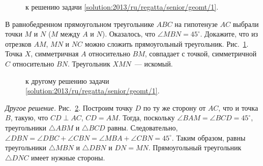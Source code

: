 \ifsolution
\begin{figure}\centering
    \caption{к решению задачи \ref{solution:2013/ru/regatta/senior/geomt/1}.}
    \label{fig:solution:2013/ru/regatta/senior/geomt/1}
\end{figure}%
\fi %

\problem
В равнобедренном прямоугольном треугольнике $ABC$ на гипотенузе $AC$ выбрали
точки $M$ и $N$ ($M$ между $A$ и $N$).
Оказалось, что $\angle MBN = 45^\circ$.
Докажите, что из отрезков $AM$, $MN$ и $NC$ можно сложить прямоугольный
треугольник.
\solution
\label{solution:2013/ru/regatta/senior/geomt/1}%
Рис.~\ref{fig:solution:2013/ru/regatta/senior/geomt/1}.
Точка $X$, симметричная $A$ относительно $BM$, совпадает с точкой, симметричной
$C$ относительно $BN$.
Треугольник $XMN$~--- искомый.
\par
\begin{figure}\centering
    \caption{к другому решению задачи
        \ref{solution:2013/ru/regatta/senior/geomt/1}.}
    \label{fig:solution:2013/ru/regatta/senior/geomt/1/another}
\end{figure}%
\emph{Другое решение.}
Рис.~\ref{fig:solution:2013/ru/regatta/senior/geomt/1/another}.
Построим точку $D$ по ту же сторону от $AC$, что и точка $B$, такую, что
$CD \perp AC$, $CD = AM$.
Тогда, поскольку $\angle BAM = \angle BCD = 45^\circ$, треугольники
$\triangle ABM$ и $\triangle BCD$ равны.
Следовательно,
$\angle DBN = \angle DBC + \angle CBN = \angle MBA + \angle CBN = 45^\circ$.
Таким образом, равны треугольники $\triangle MBN$ и $\triangle DBN$ и
$DN = MN$.
Прямоугольный треугольник $\triangle DNC$ имеет нужные стороны.
\endproblem
